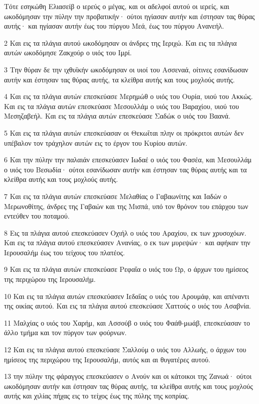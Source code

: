 \par Τότε εσηκώθη Ελιασείβ ο ιερεύς ο μέγας, και οι αδελφοί αυτού οι ιερείς, και ωκοδόμησαν την πύλην την προβατικήν· ούτοι ηγίασαν αυτήν και έστησαν τας θύρας αυτής· και ηγίασαν αυτήν έως του πύργου Μεά, έως του πύργου Ανανεήλ.
\par 2 Και εις τα πλάγια αυτού ωκοδόμησαν οι άνδρες της Ιεριχώ. Και εις τα πλάγια αυτών ωκοδόμησε Ζακχούρ ο υιός του Ιμρί.
\par 3 Την θύραν δε την ιχθυϊκήν ωκοδόμησαν οι υιοί του Ασσεναά, οίτινες εσανίδωσαν αυτήν και έστησαν τας θύρας αυτής, τα κλείθρα αυτής και τους μοχλούς αυτής.
\par 4 Και εις τα πλάγια αυτών επεσκεύασε Μερημώθ ο υιός του Ουρία, υιού του Ακκώς. Και εις τα πλάγια αυτών επεσκεύασε Μεσουλλάμ ο υιός του Βαραχίου, υιού του Μεσηζαβεήλ. Και εις τα πλάγια αυτών επεσκεύασε Σαδώκ ο υιός του Βαανά.
\par 5 Και εις τα πλάγια αυτών επεσκεύασαν οι Θεκωΐται πλην οι πρόκριτοι αυτών δεν υπέβαλον τον τράχηλον αυτών εις το έργον του Κυρίου αυτών.
\par 6 Και την πύλην την παλαιάν επεσκεύασεν Ιωδαέ ο υιός του Φασέα, και Μεσουλλάμ ο υιός του Βεσωδία· ούτοι εσανίδωσαν αυτήν και έστησαν τας θύρας αυτής και τα κλείθρα αυτής και τους μοχλούς αυτής.
\par 7 Και εις τα πλάγια αυτών επεσκεύασε Μελαθίας ο Γαβαωνίτης και Ιαδών ο Μερωνοθίτης, άνδρες της Γαβαών και της Μισπά, υπό τον θρόνον του επάρχου των εντεύθεν του ποταμού.
\par 8 Εις τα πλάγια αυτού επεσκεύασεν Οχιήλ ο υιός του Αραχίου, εκ των χρυσοχόων. Και εις τα πλάγια αυτού επεσκεύασεν Ανανίας, ο εκ των μυρεψών· και αφήκαν την Ιερουσαλήμ έως του τείχους του πλατέος.
\par 9 Και εις τα πλάγια αυτών επεσκεύασε Ρεφαΐα ο υιός του Ωρ, ο άρχων του ημίσεος της περιχώρου της Ιερουσαλήμ.
\par 10 Και εις τα πλάγια αυτών επεσκεύασεν Ιεδαΐας ο υιός του Αρουμάφ, και απέναντι της οικίας αυτού. Και εις τα πλάγια αυτού επεσκεύασε Χαττούς ο υιός του Ασαβνία.
\par 11 Μαλχίας ο υιός του Χαρήμ, και Ασσούβ ο υιός του Φαάθ-μωάβ, επεσκεύασαν το άλλο τμήμα και τον πύργον των φούρνων.
\par 12 Και εις τα πλάγια αυτού επεσκεύασε Σαλλούμ ο υιός του Αλλωής, ο άρχων του ημίσεος της περιχώρου της Ιερουσαλήμ, αυτός και αι θυγατέρες αυτού.
\par 13 την πύλην της φάραγγος επεσκεύασεν ο Ανούν και οι κάτοικοι της Ζανωά· ούτοι ωκοδόμησαν αυτήν και έστησαν τας θύρας αυτής, τα κλείθρα αυτής και τους μοχλούς αυτής και χιλίας πήχας εις το τείχος έως της πύλης της κοπρίας.
